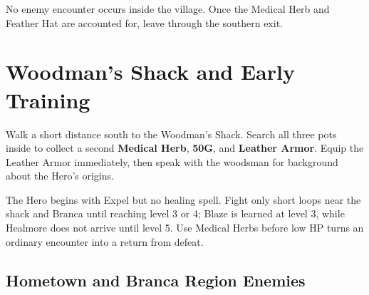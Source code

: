 \documentclass[
  american,
  10pt,
  letterpaper,
  oneside,
  open=any]{scrreprt}
\begin{document}
No enemy encounter occurs inside the village. Once the Medical Herb and
Feather Hat are accounted for, leave through the southern exit.

\section{Woodman's Shack and Early
Training}\label{woodmans-shack-and-early-training}

Walk a short distance south to the Woodman's Shack. Search all three
pots inside to collect a second \textbf{Medical Herb}, \textbf{50G}, and
\textbf{Leather Armor}. Equip the Leather Armor immediately, then speak
with the woodsman for background about the Hero's origins.

The Hero begins with Expel but no healing spell. Fight only short loops
near the shack and Branca until reaching level 3 or 4; Blaze is learned
at level 3, while Healmore does not arrive until level 5. Use Medical
Herbs before low HP turns an ordinary encounter into a return from
defeat.

\subsection{Hometown and Branca Region
Enemies}\label{hometown-and-branca-region-enemies}
\end{document}
